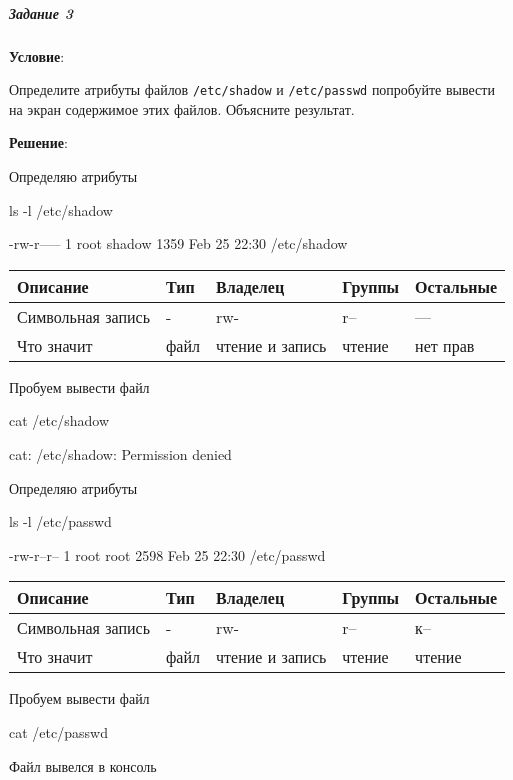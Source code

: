 \subparagraph{Задание 3} \textbf{Условие}:

Определите атрибуты файлов \verb|/etc/shadow| и \verb|/etc/passwd| попробуйте вывести на экран содержимое этих файлов.
Объясните результат.

\textbf{Решение}:

Определяю атрибуты

\begin{BashBox}
    ls -l /etc/shadow
\end{BashBox}

\begin{OutBox}
    -rw-r----- 1 root shadow 1359 Feb 25 22:30 /etc/shadow
\end{OutBox}

\begin{table}[h!]
    \centering
    \begin{tabular}{ | l | l | l | l | l | }
        \hline
        Описание            & Тип   & Владелец          & Группы    & Остальные \\ \hline
        \hline
        Символьная  запись  & -     & rw-               & r--       & ---       \\ \hline
        Что значит          & файл  & чтение и запись   & чтение    & нет прав  \\ \hline
    \end{tabular}
\end{table}

Пробуем вывести файл

\begin{BashBox}
    cat /etc/shadow
\end{BashBox}

\begin{OutBox}
    cat: /etc/shadow: Permission denied
\end{OutBox}

Определяю атрибуты

\begin{BashBox}
    ls -l /etc/passwd
\end{BashBox}

\begin{OutBox}
    -rw-r--r-- 1 root root 2598 Feb 25 22:30 /etc/passwd
\end{OutBox}

\begin{table}[h!]
    \centering
    \begin{tabular}{ | l | l | l | l | l | }
        \hline
        Описание            & Тип   & Владелец          & Группы    & Остальные \\ \hline
        \hline
        Символьная  запись  & -     & rw-               & r--       & к--       \\ \hline
        Что значит          & файл  & чтение и запись   & чтение    & чтение    \\ \hline
    \end{tabular}
\end{table}

Пробуем вывести файл

\begin{BashBox}
    cat /etc/passwd
\end{BashBox}

Файл вывелся в консоль

